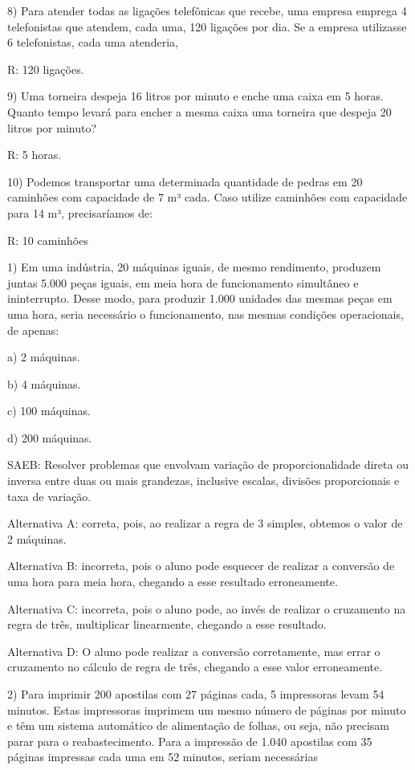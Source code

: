 8) Para atender todas as ligações telefônicas que recebe, uma empresa
emprega 4 telefonistas que atendem, cada uma, 120 ligações por dia. Se a
empresa utilizasse 6 telefonistas, cada uma atenderia,

R: 120 ligações.

9) Uma torneira despeja 16 litros por minuto e enche uma caixa em 5
horas. Quanto tempo levará para encher a mesma caixa uma torneira que
despeja 20 litros por minuto?

R: 5 horas.

10) Podemos transportar uma determinada quantidade de pedras em 20
caminhões com capacidade de 7 m³ cada. Caso utilize caminhões com
capacidade para 14 m³, precisaríamos de:

R: 10 caminhões


1) Em uma indústria, 20 máquinas iguais, de mesmo rendimento, produzem
juntas 5.000 peças iguais, em meia hora de funcionamento simultâneo e
ininterrupto. Desse modo, para produzir 1.000 unidades das mesmas peças
em uma hora, seria necessário o funcionamento, nas mesmas condições
operacionais, de apenas:

a) 2 máquinas.

b) 4 máquinas.

c) 100 máquinas.

d) 200 máquinas.

SAEB: Resolver problemas que envolvam variação de proporcionalidade
direta ou inversa entre duas ou mais grandezas, inclusive escalas,
divisões proporcionais e taxa de variação.

Alternativa A: correta, pois, ao realizar a regra de 3 simples, obtemos
o valor de 2 máquinas.

Alternativa B: incorreta, pois o aluno pode esquecer de realizar a
conversão de uma hora para meia hora, chegando a esse resultado
erroneamente.

Alternativa C: incorreta, pois o aluno pode, ao invés de realizar o
cruzamento na regra de três, multiplicar linearmente, chegando a esse
resultado.

Alternativa D: O aluno pode realizar a conversão corretamente, mas errar
o cruzamento no cálculo de regra de três, chegando a esse valor
erroneamente.

2) Para imprimir 200 apostilas com 27 páginas cada, 5 impressoras levam
54 minutos. Estas impressoras imprimem um mesmo número de páginas por
minuto e têm um sistema automático de alimentação de folhas, ou seja,
não precisam parar para o reabastecimento. Para a impressão de 1.040
apostilas com 35 páginas impressas cada uma em 52 minutos, seriam
necessárias

